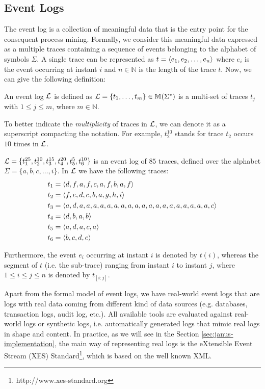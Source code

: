 \subsection{Event Logs}
The event log is a collection of meaningful data that is the entry point for the consequent process mining. Formally, we consider this meaningful data expressed as a multiple traces containing a sequence of events belonging to the alphabet of symbols $\Sigma$. A single trace can be represented as $t = \langle e_1,e_2,\dots,e_n \rangle$ where $e_i$ is the event occurring at instant $i$ and $n \in \mathbb{N}$ is the length of the trace $t$.  Now, we can give the following definition:
\begin{definition}
An event log $\mathcal{L}$ is defined as $\mathcal{L} = \{t_1,\dots,t_m\} \in \mathbb{M} (\Sigma^*)$ is a multi-set of traces $t_j$ with $1 \le j \le m$, where $m \in \mathbb{N}$.
\end{definition}
To better indicate the \textit{multiplicity} of traces in $\mathcal{L}$, we can denote it as a superscript compacting the notation. For example, $t_{2}^{10}$ stands for trace $t_2$ occurs $10$ times in $\mathcal{L}$.
\begin{example}\label{ex:traces}
$\mathcal{L} = \{t_{1}^{25},t_{2}^{10},t_{3}^{15},t_{4}^{20},t_{5}^{5},t_{6}^{10}\}$ is an event log of $85$ traces, defined over the alphabet $\Sigma = \{a,b,c,\dots, i \} $. In $ \mathcal{L} $ we have the following traces:
\begin{align*}
t_1 &= \langle d,f,a,f,c,a,f,b,a,f \rangle\\
t_2 &= \langle f,e,d,c,b,a,g,h,i \rangle\\
t_3 &= \langle a,d,a,a,a,a,a,a,a,a,a,a,a,a,a,a,a,a,a,a,a,c \rangle\\
t_4 &= \langle d,b,a,b \rangle\\
t_5 &= \langle a,d,a,c,a \rangle\\
t_6 &= \langle b,c,d,e \rangle
\end{align*}
\end{example}
Furthermore, the event $e_i$ occurring at instant $i$ is denoted by $t(i)$, whereas the segment of $t$ (i.e. the sub-trace) ranging from instant $i$ to instant $j$, where $1 \le i \le j \le n$ is denoted by $t_{[i:j]}$.

Apart from the formal model of event logs, we have real-world event logs that are logs with real data coming from different kind of data sources (e.g. databases, transaction logs, audit log, etc.). All available tools are evaluated against real-world logs or synthetic logs, i.e. automatically generated logs that mimic real logs in shape and content. In practice, as we will see in the Section \ref{sec:janus-implementation}, the main way of representing real logs is the eXtensible Event Stream (XES) Standard\footnote{http://www.xes-standard.org}, which is based on the well known XML.
